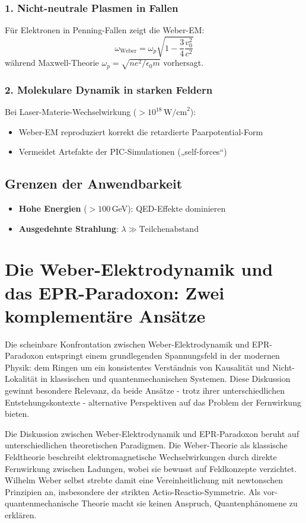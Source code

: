 \subsubsection{1. Nicht-neutrale Plasmen in Fallen}
Für Elektronen in Penning-Fallen zeigt die Weber-EM:
\begin{equation}
\omega_{\text{Weber}} = \omega_p\sqrt{1 - \frac{3}{4}\frac{v_0^2}{c^2}}
\end{equation}
während Maxwell-Theorie $\omega_p = \sqrt{ne^2/\epsilon_0 m}$ vorhersagt.

\subsubsection{2. Molekulare Dynamik in starken Feldern}
Bei Laser-Materie-Wechselwirkung ($>10^{18}\,\text{W/cm}^2$):
\begin{itemize}
\item Weber-EM reproduziert korrekt die retardierte Paarpotential-Form
\item Vermeidet Artefakte der PIC-Simulationen („self-forces“)
\end{itemize}

\subsection{Grenzen der Anwendbarkeit}
\begin{itemize}
\item \textbf{Hohe Energien} ($>100$\,GeV): QED-Effekte dominieren
\item \textbf{Ausgedehnte Strahlung}:  $\lambda \gg \text{Teilchenabstand}$
\end{itemize}

\section{Die Weber-Elektrodynamik und das EPR-Paradoxon: Zwei komplementäre Ansätze}
Die scheinbare Konfrontation zwischen Weber-Elektrodynamik und EPR-Paradoxon entspringt einem grundlegenden Spannungsfeld in der modernen Physik: dem Ringen um ein konsistentes
Verständnis von Kausalität und Nicht-Lokalität in klassischen und quantenmechanischen Systemen. Diese Diskussion gewinnt besondere Relevanz, da beide Ansätze - trotz ihrer
unterschiedlichen Entstehungskontexte - alternative Perspektiven auf das Problem der Fernwirkung bieten.

Die Diskussion zwischen Weber-Elektrodynamik und EPR-Paradoxon beruht auf unterschiedlichen theoretischen Paradigmen. Die Weber-Theorie als klassische Feldtheorie beschreibt
elektromagnetische Wechselwirkungen durch direkte Fernwirkung zwischen Ladungen, wobei sie bewusst auf Feldkonzepte verzichtet. Wilhelm Weber selbst strebte damit eine Vereinheitlichung
mit newtonschen Prinzipien an, insbesondere der strikten Actio-Reactio-Symmetrie. Als vor-quantenmechanische Theorie macht sie keinen Anspruch, Quantenphänomene zu erklären.

